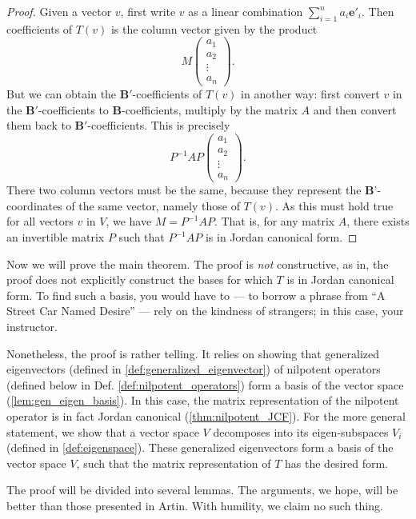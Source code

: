 \begin{proof}
Given a vector $v$, first write $v$ as a linear combination
$\sum_{i = 1}^n a_i\mathbf{e}'_i$. Then coefficients of $T(v)$ is 
the column vector given by the product
\[
M\left(
\begin{matrix}
a_1\\
a_2\\
\vdots\\
a_n
\end{matrix}
\right).
\]
But we can obtain the $\mathbf{B}'$-coefficients of $T(v)$ in
another way: first convert $v$ in the $\mathbf{B}'$-coefficients 
to $\mathbf{B}$-coefficients, multiply by the matrix $A$ and then
convert them back to $\mathbf{B}'$-coefficients. This is precisely
\[
P^{-1}AP\left(
\begin{matrix}
a_1\\
a_2\\
\vdots\\
a_n
\end{matrix}
\right).
\]
There two column vectors must be the same, because they represent
the $\mathbf{B}$'-coordinates of the same vector, namely those of 
$T(v)$. As this must hold true for all vectors $v$ in $V$, we have
$M = P^{-1}AP$. That is, for any matrix $A$, there exists an 
invertible matrix $P$ such that $P^{-1}AP$ is in Jordan canonical
form.
\end{proof}

Now we will prove the main theorem. The proof is \emph{not} 
constructive, as in, the proof does not explicitly construct the
bases for which $T$ is in Jordan canonical form. To find such a
basis, you would have to --- to borrow a phrase from ``A Street
Car Named Desire'' --- rely on the kindness of strangers; in this 
case, your instructor. 

Nonetheless, the proof is rather telling. It relies on 
showing that generalized eigenvectors (defined in 
\ref{def:generalized_eigenvector}) of nilpotent operators (defined 
below in Def. \ref{def:nilpotent_operators}) form a basis of
the vector space (\ref{lem:gen_eigen_basis}). In this case, the 
matrix representation of the nilpotent operator is in fact Jordan 
canonical (\ref{thm:nilpotent_JCF}). For the more general 
statement, we show that a vector space $V$ decomposes into its
eigen-subspaces $V_i$ (defined in \ref{def:eigenspace}). These 
generalized eigenvectors form a basis of the vector space $V$,
such that the matrix representation of $T$ has the desired form.

The proof will be divided into several lemmas. The arguments, we 
hope, will be better than those presented in Artin. With humility, 
we claim no such thing.

